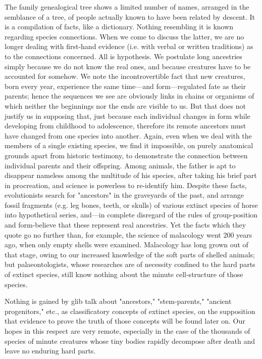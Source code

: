 The family genealogical tree shows a limited number of names, arranged in the semblance of
a tree, of people actually known to have been related by descent. It is a compilation of facts,
like a dictionary. Nothing resembling it is known regarding species connections. When we
come to discuss the latter, we are no longer dealing with first-hand evidence (i.e. with verbal
or written traditions) as to the connections concerned. All is hypothesis. We postulate long
ancestries simply because we do not know the real ones, and because creatures have to be
accounted for somehow. We note the incontrovertible fact that new creatures, born every
year, experience the same time—and form—regulated fate as their parents; hence the
sequences we see are obviously links in chains or organisms of which neither the beginnings
nor the ends are visible to us. But that does not justify us in supposing that, just because each
individual changes in form while developing from childhood to adolescence, therefore its
remote ancestors must have changed from one species into another. Again, even when we
deal with the members of a single existing species, we find it impossible, on purely
anatomical grounds apart from historic testimony, to demonstrate the connection between
individual parents and their offspring. Among animals, the father is apt to disappear nameless
among the multitude of his species, after taking his brief part in procreation, and science is
powerless to re-identify him. Despite these facts, evolutionists search for "ancestors" in the
graveyards of the past, and arrange fossil fragments (e.g. leg bones, teeth, or skulls) of
various extinct species of horse into hypothetical series, and—in complete disregard of the
rules of group-position and form-believe that these represent real ancestries. Yet the facts
which they quote go no further than, for example, the science of malacology went 200 years
ago, when only empty shells were examined. Malacology has long grown out of that stage,
owing to our increased knowledge of the soft parts of shelled animals; but palaeontologists,
whose researches are of necessity confined to the hard parts of extinct species, still know
nothing about the minute cell-structure of those species.

Nothing is gained by glib talk about "ancestors," "stem-parents," "ancient progenitors," etc.,
as classificatory concepts of extinct species, on the supposition that evidence to prove the
truth of those concepts will be found later on. Our hopes in this respect are very remote,
especially in the case of the thousands of species of minute creatures whose tiny bodies
rapidly decompose after death and leave no enduring hard parts.


